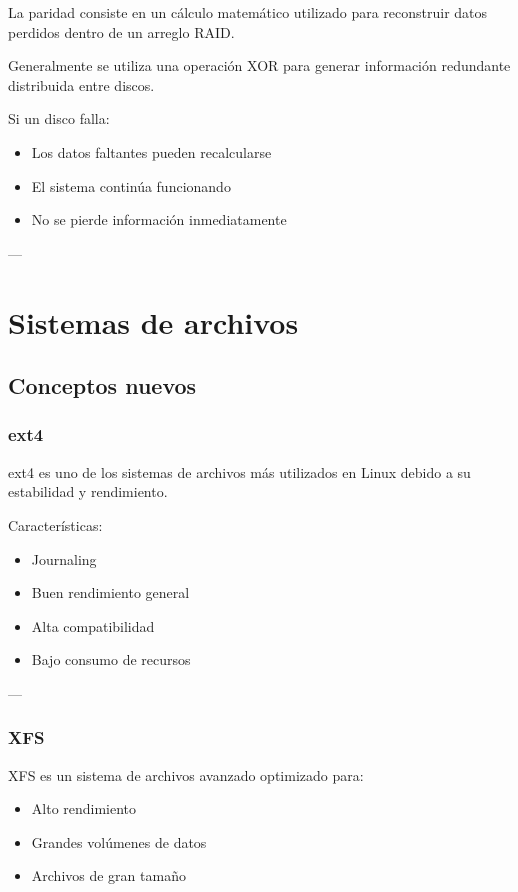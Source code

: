 \documentclass[11pt, letterpaper]{article}
\begin{document}
La paridad consiste en un cálculo matemático utilizado para reconstruir datos perdidos dentro de un arreglo RAID.

Generalmente se utiliza una operación XOR para generar información redundante distribuida entre discos.

Si un disco falla:

\begin{itemize}
\item Los datos faltantes pueden recalcularse
\item El sistema continúa funcionando
\item No se pierde información inmediatamente
\end{itemize}

---
\section{Sistemas de archivos}
\label{sec:orgcd55d52}

\subsection{Conceptos nuevos}
\label{sec:orga885e5d}

\subsubsection{ext4}
\label{sec:org26f669d}

ext4 es uno de los sistemas de archivos más utilizados en Linux debido a su estabilidad y rendimiento.

Características:

\begin{itemize}
\item Journaling
\item Buen rendimiento general
\item Alta compatibilidad
\item Bajo consumo de recursos
\end{itemize}

---
\subsubsection{XFS}
\label{sec:orgbeb2399}

XFS es un sistema de archivos avanzado optimizado para:

\begin{itemize}
\item Alto rendimiento
\item Grandes volúmenes de datos
\item Archivos de gran tamaño
\end{itemize}
\end{document}

